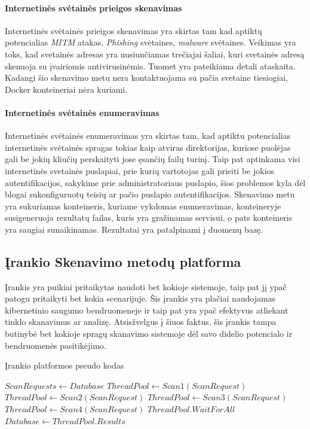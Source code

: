 \documentclass[a4paper,12pt,fleqn]{article}
\begin{document}
\paragraph{Internetinės svėtainės prieigos skenavimas}
Internetinės svėtainės prieigos skenavimas yra skirtas tam kad aptiktų potencialias \textit{MITM} atakas, \textit{Phishing} svėtaines, \textit{malware} svėtaines. Veikimas yra toks, kad svetainės adresas yra nusiunčiamas trečiajai šaliai, kuri svetainės adresą skenuoja su įvairiomis antivirusinėmis. Tuomet yra pateikiama detali ataskaita. Kadangi šio skenavimo metu nera kontaktuojama su pačia svetaine tiesiogiai, Docker konteineriai nėra kuriami.
\paragraph{Internetinės svėtainės enumeravimas}
Internetinės svėtainės enumeravimas yra skirtas tam, kad aptiktu potencialias internetinės svėtainės spragas tokias kaip atviras direktorijas, kuriose puolėjas gali be jokių kliučių perskaityti jose ęsančių failų turinį. Taip pat aptinkama visi internetinės svetainės puslapiai, prie kurių vartotojas gali prieiti be jokios autentifikacijos, sakykime prie administratoriaus puslapio, šios problemos kyla dėl blogai sukonfiguruotų teisių ar pačio puslapio autentifikacijos. Skenavimo metu yra sukuriamas konteineris, kuriame vykdomas enumeravimas, konteineryje susigeneruoja rezultatų failas, kuris yra gražinamas servisui, o pats konteineris yra saugiai sunaikinamas. Rezultatai yra patalpinami į duomenų bazę.

\subsection{Įrankio Skenavimo metodų platforma}

Įrankis yra puikiai pritaikytas naudoti bet kokioje sistemoje, taip pat jį ypač patogu pritaikyti bet kokia scenarijuje. Šis įrankis yra plačiai naudojamas kibernetinio saugumo bendruomeneje ir taip pat yra ypač efektyvus atliekant tinklo skanavimus ar analizę. Atsisžvelgus į šiuos faktus, šis įrankis tampa butinybė bet kokioje spragų skanavimo sistemoje dėl savo didelio potencialo ir bendruomenės pasitikėjimo.
\begin{algorithm}
	\caption{Įrankio platformos pseudo kodas}
	\label{alg:pseudo}
	\begin{algorithmic}
		\STATE $ScanRequests \gets Database$
		\STATE $ThreadPool \gets Scan1(ScanRequest)$
		\STATE $ThreadPool \gets Scan2(ScanRequest)$
		\STATE $ThreadPool \gets Scan3(ScanRequest)$
		\STATE $ThreadPool \gets Scan4(ScanRequest)$
		\STATE $ThreadPool. Wait For All$
		\ENDFOR
		\STATE $Database \gets ThreadPool.Results$
		\ENDIF
	\end{algorithmic}
\end{algorithm}
\end{document}
